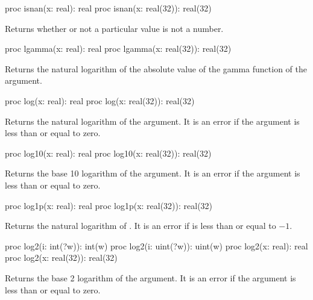\begin{protohead}
proc isnan(x: real): real
proc isnan(x: real(32)): real(32)
\end{protohead}
\begin{protobody}
Returns whether or not a particular value is not a number.
\end{protobody}

\begin{protohead}
proc lgamma(x: real): real
proc lgamma(x: real(32)): real(32)
\end{protohead}
\begin{protobody}
Returns the natural logarithm of the absolute value
of the gamma function of the argument.
\end{protobody}

\begin{protohead}
proc log(x: real): real
proc log(x: real(32)): real(32)
\end{protohead}
\begin{protobody}
Returns the natural logarithm of the argument.  It is an error if the
argument is less than or equal to zero.
\end{protobody}

\begin{protohead}
proc log10(x: real): real
proc log10(x: real(32)): real(32)
\end{protohead}
\begin{protobody}
Returns the base 10 logarithm of the argument.  It is an error if the
argument is less than or equal to zero.
\end{protobody}

\begin{protohead}
proc log1p(x: real): real
proc log1p(x: real(32)): real(32)
\end{protohead}
\begin{protobody}
Returns the natural logarithm of .  It is an error
if  is less than or equal to $-1$.
\end{protobody}

\begin{protohead}
proc log2(i: int(?w)): int(w)
proc log2(i: uint(?w)): uint(w)
proc log2(x: real): real
proc log2(x: real(32)): real(32)
\end{protohead}
\begin{protobody}
Returns the base 2 logarithm of the argument.  It is an error if the
argument is less than or equal to zero.
\end{protobody}

